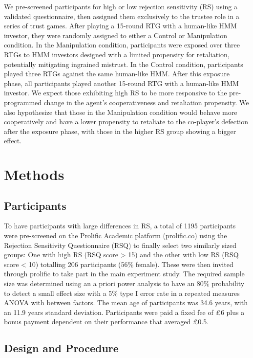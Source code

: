 \documentclass[
]{article}
\begin{document}
We pre-screened participants for high or low rejection sensitivity (RS) using a validated questionnaire, then assigned them exclusively to the trustee role in a series of trust games. After playing a 15-round RTG with a human-like HMM investor, they were randomly assigned to either a Control or Manipulation condition. In the Manipulation condition, participants were exposed over three RTGs to HMM investors designed with a limited propensity for retaliation, potentially mitigating ingrained mistrust. In the Control condition, participants played three RTGs against the same human-like HMM. After this exposure phase, all participants played another 15-round RTG with a human-like HMM investor. We expect those exhibiting high RS to be more responsive to the pre-programmed change in the agent's cooperativeness and retaliation propensity. We also hypothesize that those in the Manipulation condition would behave more cooperatively and have a lower propensity to retaliate to the co-player's defection after the exposure phase, with those in the higher RS group showing a bigger effect.

\section{Methods}\label{methods}

\subsection{Participants}\label{participants}

To have participants with large differences in RS, a total of 1195 participants were pre-screened on the Prolific Academic platform (prolific.co) using the Rejection Sensitivity Questionnaire (RSQ) to finally select two similarly sized groups: One with high RS (RSQ score \textgreater{} 15) and the other with low RS (RSQ score \textless{} 10) totalling 206 participants (56\% female). These were then invited through prolific to take part in the main experiment study. The required sample size was determined using an a priori power analysis to have an 80\% probability to detect a small effect size with a 5\% type I error rate in a repeated measures ANOVA with between factors. The mean age of participants was 34.6 years, with an 11.9 years standard deviation. Participants were paid a fixed fee of £6 plus a bonus payment dependent on their performance that averaged £0.5.

\subsection{Design and Procedure}\label{design-and-procedure}
\end{document}
